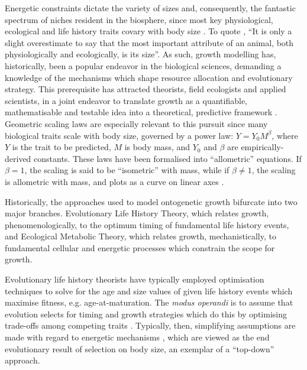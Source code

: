 \documentclass[a4paper]{article} %
\begin{document}
    Energetic constraints dictate the variety of sizes and, consequently, the fantastic spectrum of niches resident in the biosphere, since most key physiological, ecological and life history traits covary with body size \autocite{peters1983, brown2000-scaling-book,schmidt1984scaling,Marshall2019b}. To quote \textcite{Bartholomew1981}, ``It is only a slight overestimate to say that the most important attribute of an animal, both physiologically and ecologically, is its size''. As such, growth modelling has, historically, been a popular endeavor in the biological sciences, demanding a knowledge of the mechanisms which shape resource allocation and evolutionary strategy. This prerequisite has attracted theorists, field ecologists and applied scientists, in a joint endeavor to translate growth as a quantifiable, mathematisable and testable idea into a theoretical, predictive framework \autocite{popper1962,popper1972,peters1983, West2011}. Geometric scaling laws are especially relevant to this pursuit since many biological traits scale with body size, governed by a power law: $Y = Y_0 M^{\beta}$, where $Y$ is the trait to be predicted, $M$ is body mass, and $Y_0$ and $\beta$ are empirically-derived constants. These laws have been formalised into ``allometric'' equations. If $\beta = 1$, the scaling is said to be ``isometric'' with mass, while if $\beta \neq 1$, the scaling is allometric with mass, and plots as a curve on linear axes \autocite{brown2000-scaling-book}.

    Historically, the approaches used to model ontogenetic growth bifurcate into two major branches. Evolutionary Life History Theory, which relates growth, phenomenologically, to the optimum timing of fundamental life history events, and Ecological Metabolic Theory, which relates growth, mechanistically, to fundamental cellular and energetic processes which constrain the scope for growth.
        
    Evolutionary life history theorists have typically employed optimisation techniques to solve for the age and size values of given life history events which maximise fitness, e.g. age-at-maturation. The \textit{modus operandi} is to assume that evolution selects for timing and growth strategies which do this by optimising trade-offs among competing traits \autocite{Day1997, Stearns1989, stearns1992evolution}. Typically, then, simplifying assumptions are made with regard to energetic mechanisms \autocite{Day1997, Kozowski1987-indeterminate}, which are viewed as the end evolutionary result of selection on body size, an exemplar of a ``top-down'' approach.
        
\end{document}
